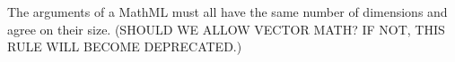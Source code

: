 The arguments of a MathML  must all have the same number
of dimensions and agree on their size.  
{\color{red} (SHOULD WE ALLOW VECTOR MATH? IF NOT, THIS RULE WILL BECOME DEPRECATED.)}
